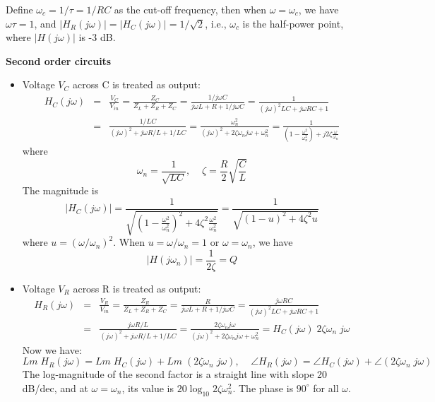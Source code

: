 
Define $\omega_c=1/\tau=1/RC$ as the cut-off frequency, then when $\omega=\omega_c$, 
we have $\omega\tau=1$, and $|H_R(j\omega)|=|H_C(j\omega)|=1/\sqrt{2}$, i.e., $\omega_c$
is the half-power point, where $|H(j\omega)|$ is -3 dB.

{\bf Second order circuits}


\begin{itemize}
\item Voltage $V_C$ across C is treated as output:
  \begin{eqnarray}
    H_C(j\omega)&=&\frac{V_C}{V_{in}}=\frac{Z_C}{Z_L+Z_R+Z_C}
    =\frac{1/j\omega C}{j\omega L+R+1/j\omega C}
    =\frac{1}{(j\omega)^2 LC+j\omega RC+1}
    \nonumber \\
    &=&\frac{1/LC}{(j\omega)^2 +j\omega R/L+1/LC}
    =\frac{\omega_n^2}{(j\omega)^2 +2\zeta\omega_n j\omega+\omega^2_n} 
    =\frac{1}{(1-\frac{\omega^2}{\omega_n^2})+j2\zeta\frac{\omega}{\omega_n}}
    \nonumber 
  \end{eqnarray}
  where 
  \[ \omega_n=\frac{1}{\sqrt{LC}},\;\;\;\;\zeta=\frac{R}{2}\sqrt{\frac{C}{L}} \]
  The magnitude is
  \[ |H_C(j\omega)|
  =\frac{1}{\sqrt{(1-\frac{\omega^2}{\omega_n^2})^2+4\zeta^2 \frac{\omega^2}{\omega_n^2}}}
  =\frac{1}{\sqrt{(1-u)^2+4\zeta^2 u}} \]
  where $u=(\omega/\omega_n)^2$. When $u=\omega/\omega_n=1$ or $\omega=\omega_n$, we have
  \[ | H(j\omega_n) |=\frac{1}{2\zeta}=Q \]
\item Voltage $V_R$ across R is treated as output:
  \begin{eqnarray}
    H_R(j\omega)&=&\frac{V_R}{V_{in}}=\frac{Z_R}{Z_L+Z_R+Z_C}
    =\frac{R}{j\omega L+R+1/j\omega C}
    =\frac{j\omega RC}{(j\omega)^2 LC+j\omega RC+1}
    \nonumber \\
    &=&\frac{j\omega R/L}{(j\omega)^2 +j\omega R/L+1/LC}
    =\frac{2\zeta\omega_nj\omega}{(j\omega)^2 +2\zeta\omega_n j\omega+\omega^2_n} 
    =H_C(j\omega) \;2\zeta \omega_n\;j \omega 
    \nonumber 
  \end{eqnarray}
  Now we have:
  \[ Lm\;H_R(j\omega)=Lm\; H_C(j\omega)+Lm\;(2\zeta\omega_n\;j\omega),\;\;\;\;
  \angle H_R(j\omega)=\angle H_C(j\omega)+\angle(2\zeta\omega_n\;j\omega) \]
  The log-magnitude of the second factor is a straight line with slope 20 dB/dec,
  and at $\omega=\omega_n$, its value is $20\log_{10} 2\zeta\omega_n^2$. The phase is 
  $90^\circ$ for all $\omega$.
  

\end{itemize}
